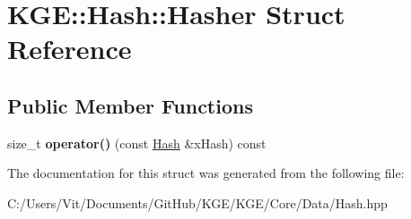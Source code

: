 \hypertarget{struct_k_g_e_1_1_hash_1_1_hasher}{\section{K\-G\-E\-:\-:Hash\-:\-:Hasher Struct Reference}
\label{struct_k_g_e_1_1_hash_1_1_hasher}
}
\subsection*{Public Member Functions}
\begin{DoxyCompactItemize}
\item 
\hypertarget{struct_k_g_e_1_1_hash_1_1_hasher_a7c9b04b2879932ca3f37fcee88bf6b49}{size\-\_\-t {\bfseries operator()} (const \hyperlink{class_k_g_e_1_1_hash}{Hash} \&x\-Hash) const }\label{struct_k_g_e_1_1_hash_1_1_hasher_a7c9b04b2879932ca3f37fcee88bf6b49}

\end{DoxyCompactItemize}


The documentation for this struct was generated from the following file\-:\begin{DoxyCompactItemize}
\item 
C\-:/\-Users/\-Vit/\-Documents/\-Git\-Hub/\-K\-G\-E/\-K\-G\-E/\-Core/\-Data/Hash.\-hpp\end{DoxyCompactItemize}
